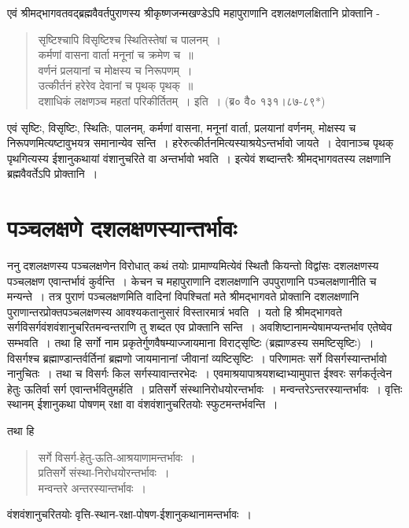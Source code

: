 {एवं श्रीमद्भागवतवद्ब्रह्मवैवर्तपुराणस्य श्रीकृष्णजन्मखण्डेऽपि महापुराणानि दशलक्षणलक्षितानि प्रोक्तानि -
\begin{verse}
सृष्टिश्चापि विसृष्टिश्च स्थितिस्तेषां च पालनम्~।\\
कर्मणां वासना वार्ता मनूनां च क्रमेण च~॥\\
वर्णनं प्रलयानां च मोक्षस्य च निरूपणम्~।\\
उत्कीर्तनं हरेरेव देवानां च पृथक् पृथक्~॥\\
दशाधिकं लक्षणञ्च महतां परिकीर्तितम्~। इति~। (ब्र० वै० १३१।८७-८९$*$)
\end{verse}
एवं सृष्टिः, विसृष्टिः, स्थितिः, पालनम्, कर्मणां वासना, मनूनां वार्ता, प्रलयानां वर्णनम्, मोक्षस्य च निरूपणमित्यष्टावुभयत्र समानान्येव सन्ति~। हरेरुत्कीर्तनमित्यस्याश्रयेऽन्तर्भावो जायते~। देवानाञ्च पृथक् पृथगित्यस्य ईशानुकथायां वंशानुचरिते वा अन्तर्भावो भवति~। इत्येवं शब्दान्तरैः श्रीमद्भागवतस्य लक्षणानि ब्रह्मवैवर्तेऽपि प्रोक्तानि~।

\section*{पञ्चलक्षणे दशलक्षणस्यान्तर्भावः}

ननु दशलक्षणस्य पञ्चलक्षणेन विरोधात् कथं तयोः प्रामाण्यमित्येवं स्थितौ कियन्तो विद्वांसः दशलक्षणस्य पञ्चलक्षण एवान्तर्भावं कुर्वन्ति~। केचन च महापुराणानि दशलक्षणानि उपपुराणानि पञ्चलक्षणानीति च मन्यन्ते~। तत्र पुराणं पञ्चलक्षणमिति वादिनां विपश्चितां मते श्रीमद्भागवते प्रोक्तानि दशलक्षणानि पुराणान्तरप्रोक्तपञ्चलक्षणस्य आवश्यकतानुसारं विस्तारमात्रं भवति~। यतो हि श्रीमद्भागवते सर्गविसर्गवंशवंशानुचरितमन्वन्तराणि तु शब्दत एव प्रोक्तानि सन्ति~। अवशिष्टानामन्येषामप्यन्तर्भाव एतेष्वेव सम्भवति~। तथा हि सर्गो नाम प्रकृतेर्गुणवैषम्याज्जायमाना विराट्सृष्टिः (ब्रह्माण्डस्य समष्टिसृष्टिः)~। विसर्गश्च ब्रह्माण्डान्तर्वर्तिनां ब्रह्मणो जायमानानां जीवानां व्यष्टिसृष्टिः~। परिणामतः सर्गे विसर्गस्यान्तर्भावो नानुचितः~। तथा च विसर्गः किल सर्गस्यावान्तरभेदः~। एवमाश्रयापाश्रयशब्दाभ्यामुपात्त ईश्वरः सर्गकर्तृत्वेन हेतुः ऊतिर्वा सर्ग एवान्तर्भवितुमर्हति~। प्रतिसर्गे संस्थानिरोधयोरन्तर्भावः~। मन्वन्तरेऽन्तरस्यान्तर्भावः~। वृत्तिः स्थानम् ईशानुकथा पोषणम् रक्षा वा वंशवंशानुचरितयोः स्फुटमन्तर्भवन्ति~।

तथा हि \
\begin{verse}
सर्गे विसर्ग-हेतु-ऊति-आश्रयाणामन्तर्भावः~।\\
प्रतिसर्गे संस्था-निरोधयोरन्तर्भावः~।\\
मन्वन्तरे अन्तरस्यान्तर्भावः~।
\end{verse}
वंशवंशानुचरितयोः वृत्ति-स्थान-रक्षा-पोषण-ईशानुकथानामन्तर्भावः~।

}
